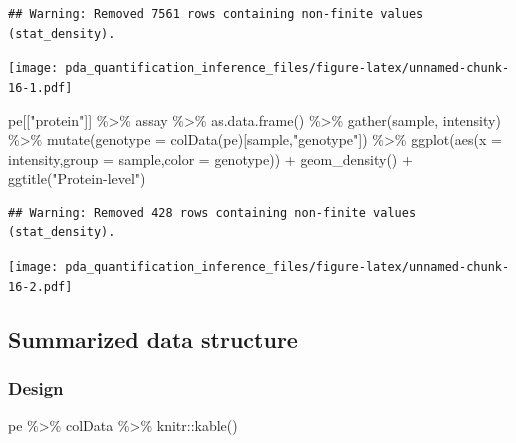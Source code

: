 \documentclass[
]{article}
\newenvironment{Shaded}{\begin{snugshade}}{\end{snugshade}}
\newcommand{\AttributeTok}[1]{\textcolor[rgb]{0.77,0.63,0.00}{#1}}
\newcommand{\FunctionTok}[1]{\textcolor[rgb]{0.00,0.00,0.00}{#1}}
\newcommand{\NormalTok}[1]{#1}
\newcommand{\SpecialCharTok}[1]{\textcolor[rgb]{0.00,0.00,0.00}{#1}}
\newcommand{\StringTok}[1]{\textcolor[rgb]{0.31,0.60,0.02}{#1}}
\begin{document}
\begin{verbatim}
## Warning: Removed 7561 rows containing non-finite values (stat_density).
\end{verbatim}

\texttt{[image: pda\_quantification\_inference\_files/figure-latex/unnamed-chunk-16-1.pdf]}

\begin{Shaded}
\begin{Highlighting}[]
\NormalTok{pe[[}\StringTok{"protein"}\NormalTok{]] }\SpecialCharTok{\%\textgreater{}\%} 
\NormalTok{  assay }\SpecialCharTok{\%\textgreater{}\%}
  \FunctionTok{as.data.frame}\NormalTok{() }\SpecialCharTok{\%\textgreater{}\%}
  \FunctionTok{gather}\NormalTok{(sample, intensity) }\SpecialCharTok{\%\textgreater{}\%} 
  \FunctionTok{mutate}\NormalTok{(}\AttributeTok{genotype =} \FunctionTok{colData}\NormalTok{(pe)[sample,}\StringTok{"genotype"}\NormalTok{]) }\SpecialCharTok{\%\textgreater{}\%}
  \FunctionTok{ggplot}\NormalTok{(}\FunctionTok{aes}\NormalTok{(}\AttributeTok{x =}\NormalTok{ intensity,}\AttributeTok{group =}\NormalTok{ sample,}\AttributeTok{color =}\NormalTok{ genotype)) }\SpecialCharTok{+} 
    \FunctionTok{geom\_density}\NormalTok{() }\SpecialCharTok{+}
    \FunctionTok{ggtitle}\NormalTok{(}\StringTok{"Protein{-}level"}\NormalTok{)}
\end{Highlighting}
\end{Shaded}

\begin{verbatim}
## Warning: Removed 428 rows containing non-finite values (stat_density).
\end{verbatim}

\texttt{[image: pda\_quantification\_inference\_files/figure-latex/unnamed-chunk-16-2.pdf]}

\hypertarget{summarized-data-structure}{%
\subsection{Summarized data structure}\label{summarized-data-structure}}

\hypertarget{design}{%
\subsubsection{Design}\label{design}}

\begin{Shaded}
\begin{Highlighting}[]
\NormalTok{pe }\SpecialCharTok{\%\textgreater{}\%} 
\NormalTok{  colData }\SpecialCharTok{\%\textgreater{}\%} 
\NormalTok{  knitr}\SpecialCharTok{::}\FunctionTok{kable}\NormalTok{()}
\end{Highlighting}
\end{Shaded}
\end{document}
